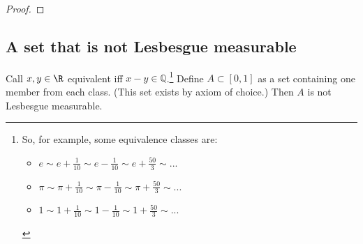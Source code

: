 \documentclass{article} %
\begin{document}
\begin{proof}
\end{proof}

\subsection{A set that is not Lesbesgue measurable}

\begin{proposition}
Call $x,y \in \R$ equivalent iff $x-y \in \mathbb{Q}$.\footnote{So, for example, some equivalence classes are:
\begin{itemize}
\item $e \sim e + \frac{1}{10} \sim e - \frac{1}{10} \sim e+\frac{50}{3} \sim ...$
\item  $\pi \sim \pi + \frac{1}{10} \sim \pi - \frac{1}{10} \sim \pi+\frac{50}{3} \sim ...$
\item $1 \sim 1 + \frac{1}{10} \sim 1 - \frac{1}{10} \sim 1 +\frac{50}{3} \sim ...$
\end{itemize}
} Define $A \subset [0,1]$ as a set containing one member from each class. (This set exists by axiom of choice.) Then $A$ is not Lesbesgue measurable.

\label{prop:existence_of_set_that_is_not_lesbesgue_measurable}
\end{proposition}
\end{document}
